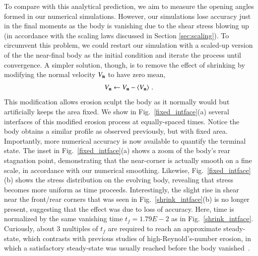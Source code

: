 \documentclass[preprint, 10pt]{elsarticle}
\begin{document}
To compare with this analytical prediction, we aim to measure the opening angles formed in our numerical simulations. However, our simulations lose accuracy just in the final moments as the body is vanishing due to the shear stress blowing up (in accordance with the scaling laws discussed in Section \ref{sec:scaling}). To circumvent this problem, we could restart our simulation with a scaled-up version of the the near-final  body as the initial condition and iterate the process until convergence. A simpler solution, though, is to remove the effect of shrinking by modifying the normal velocity $V_{\mathbf{n}}$ to have zero mean,
\begin{align*}
V_{\mathbf{n}} \leftarrow V_{\mathbf{n}} - \left< V_{\mathbf{n}} \right> \, .
\end{align*}
This modification allows erosion sculpt the body as it normally would but artificially keeps the area fixed. We show in Fig.~\ref{fixed_intface}(a) several interfaces of this modified erosion process at equally-spaced times. Notice the body obtains a similar profile as observed previously, but with fixed area. Importantly, more numerical accuracy is now available to quantify the terminal state. The inset in Fig.~\ref{fixed_intface}(a) shows a zoom of the body's rear stagnation point, demonstrating that the near-corner is actually smooth on a fine scale, in accordance with our numerical smoothing. 
Likewise, Fig.~\ref{fixed_intface}(b) shows the stress distribution on the evolving body, revealing that stress becomes more uniform as time proceeds. Interestingly, the slight rise in shear near the front/rear corners that was seen in Fig.~\ref{shrink_intface}(b) is no longer present, suggesting that the effect was due to loss of accuracy.
Here, time is normalized by the same vanishing time $t_f = 1.79E-2$ as in Fig.~\ref{shrink_intface}. Curiously, about 3 multiples of $t_f$ are required to reach an approximate steady-state, which contrasts with previous studies of high-Reynold's-number erosion, in which a satisfactory steady-state was usually reached before the body vanished~\cite{moo-ris-chi-zha-she2013}.
\end{document}
